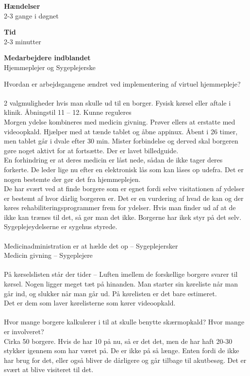 \textbf{Hændelser}\\
2-3 gange i døgnet

\textbf{Tid}\\
2-3 minutter 

\textbf{Medarbejdere indblandet}\\
Hjemmeplejer og Sygeplejerske


Hvordan er arbejdsgangene ændret ved implementering af virtuel hjemmepleje?\\\\
2 valgmuligheder hvis man skulle ud til en borger. Fysisk kørsel eller aftale i klinik. Åbningstil 11 – 12. Kunne reguleres\\
Morgen ydelse kombineres med medicin givning. Prøver ellers at erstatte med videoopkald.  Hjælper med at tænde tablet og åbne appinux. Åbent i 26 timer, men tablet går i dvale efter 30 min. Mister forbindelse og derved skal borgeren gøre noget aktivt for at fortsætte. Der er lavet billedguide. \\
En forhindring er at deres medicin er låst nede, sådan de ikke tager deres forkerte. De leder lige nu efter en elektronisk lås som kan låses op udefra. Det er nogen bestemte der gør det fra hjemmeplejen. \\
De har svært ved at finde borgere som er egnet fordi selve visitationen af ydelser er bestemt af hvor dårlig borgeren er. Det er en vurdering af hvad de kan og der køres rehabiliteringsprogrammer frem for ydelser. Hvis man finder ud af at de ikke kan trænes til det, så gør man det ikke. Borgerne har ikek styr på det selv. Sygeplejeydelserne er sygehus styrede.\\\\ 
Medicinadministration er at hælde det op – Sygeplejersker \\
Medicin givning – Sygeplejere\\\\
På kørselslisten står der tider – Luften imellem de forskellige borgere svarer til kørsel. Nogen ligger meget tæt på hinanden. Man starter sin køreliste når man går ind, og slukker når man går ud. På kørelisten er det bare estimeret. \\
Det er dem som laver kørelisterne som kører videoopkald.\\\\ 
Hvor mange borgere kalkulerer i til at skulle benytte skærmopkald? Hvor mange er involveret? \\
Cirka 50 borgere. Hvis de har 10 på nu, så er det det, men de har haft 20-30 stykker igennem som har været på. De er ikke på så længe. Enten fordi de ikke har brug for det, eller også bliver de dårligere og går tilbage til akutbesøg. Det er svært at blive visiteret til det. \\\\
